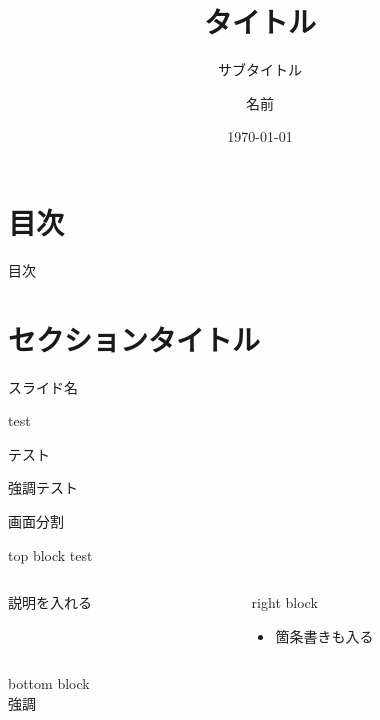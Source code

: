 \documentclass[12pt,xcolor=dvipsnames,table,dvipdfmx, aspectratio=169]{beamer} %
\title{タイトル}
\subtitle{サブタイトル}
\author[name]{名前}
\institute[workplace]{所属}
\date{\today}
\theoremstyle{definition}
\begin{document}
	\begin{frame}[plain] %
		\titlepage
	\end{frame}


 	\section*{目次} %
 	\begin{frame}{目次}
 	\tableofcontents
	 \end{frame}

\section{セクションタイトル}

\begin{frame}{\insertsection}{スライド名}
	\begin{block}{test}
	\end{block}
	
	\begin{exampleblock}{テスト}
	\end{exampleblock}
	
	\begin{alertblock}{強調テスト}
	\end{alertblock}
\end{frame}

\begin{frame}{画面分割}
  \begin{block}{top block}
  test
  \end{block}
  \begin{columns}[c]  %
    \begin{column}{0.5\textwidth} %
    説明を入れる
    \end{column}
    \begin{column}{0.5\textwidth} %
      \begin{block}{right block}
        \begin{itemize}
          \item 箇条書きも入る
        \end{itemize}
      \end{block}
    \end{column}
  \end{columns}
  \begin{block}{bottom block}
   \\
  \alert{強調}
  \end{block}
  \end{frame}



\end{document}
